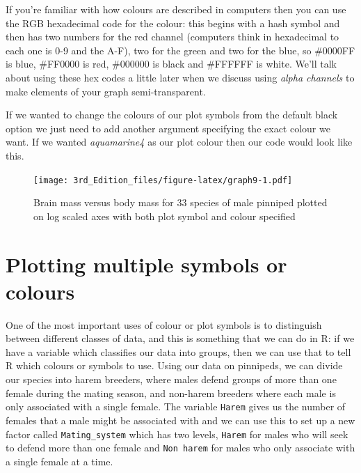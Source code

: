 \documentclass[
]{book}
\newenvironment{Shaded}{\begin{snugshade}}{\end{snugshade}}
\newcommand{\DataTypeTok}[1]{\textcolor[rgb]{0.13,0.29,0.53}{#1}}
\newcommand{\DecValTok}[1]{\textcolor[rgb]{0.00,0.00,0.81}{#1}}
\newcommand{\KeywordTok}[1]{\textcolor[rgb]{0.13,0.29,0.53}{\textbf{#1}}}
\newcommand{\NormalTok}[1]{#1}
\newcommand{\OperatorTok}[1]{\textcolor[rgb]{0.81,0.36,0.00}{\textbf{#1}}}
\newcommand{\StringTok}[1]{\textcolor[rgb]{0.31,0.60,0.02}{#1}}
\begin{document}
If you're familiar with how colours are described in computers then you can use the RGB hexadecimal code for the colour: this begins with a hash symbol and then has two numbers for the red channel (computers think in hexadecimal to each one is 0-9 and the A-F), two for the green and two for the blue, so \#0000FF is blue, \#FF0000 is red, \#000000 is black and \#FFFFFF is white. We'll talk about using these hex codes a little later when we discuss using \emph{alpha channels} to make elements of your graph semi-transparent.

If we wanted to change the colours of our plot symbols from the default black option we just need to add another argument specifying the exact colour we want. If we wanted \emph{aquamarine4} as our plot colour then our code would look like this.

\begin{Shaded}
\end{Shaded}

\begin{figure}
\centering
\texttt{[image: 3rd\_Edition\_files/figure-latex/graph9-1.pdf]}
\caption{\label{fig:graph9}Brain mass versus body mass for 33 species of male pinniped plotted on log scaled axes with both plot symbol and colour specified}
\end{figure}

\hypertarget{plotting-multiple-symbols-or-colours}{%
\section{Plotting multiple symbols or colours}\label{plotting-multiple-symbols-or-colours}}

One of the most important uses of colour or plot symbols is to distinguish between different classes of data, and this is something that we can do in R: if we have a variable which classifies our data into groups, then we can use that to tell R which colours or symbols to use. Using our data on pinnipeds, we can divide our species into harem breeders, where males defend groups of more than one female during the mating season, and non-harem breeders where each male is only associated with a single female. The variable \texttt{Harem} gives us the number of females that a male might be associated with and we can use this to set up a new factor called \texttt{Mating\_system} which has two levels, \texttt{Harem} for males who will seek to defend more than one female and \texttt{Non\ harem} for males who only associate with a single female at a time.
\end{document}
